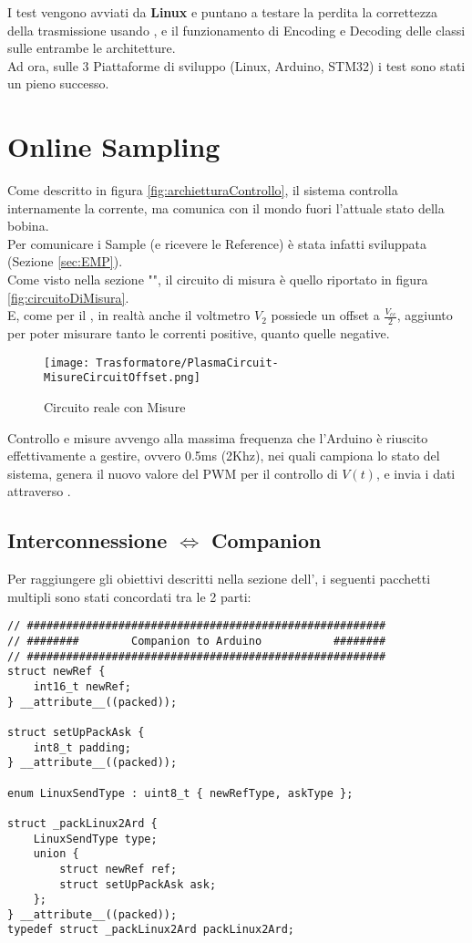 \noindent
I test vengono avviati da \textbf{Linux} e puntano a testare la perdita la correttezza della trasmissione usando , e il funzionamento di Encoding e Decoding delle classi sulle entrambe le architetture.\\
Ad ora, sulle 3 Piattaforme di sviluppo (Linux, Arduino, STM32) i test sono stati un pieno successo.

\newpage
\section{Online Sampling}
Come descritto in figura \ref{fig:archietturaControllo}, il sistema controlla internamente la corrente, ma comunica con il mondo fuori l'attuale stato della bobina.\\
Per comunicare i Sample (e ricevere le Reference) è stata infatti sviluppata (Sezione \ref{sec:EMP}).\\
Come visto nella sezione "", il circuito di misura è quello riportato in figura \ref{fig:circuitoDiMisura}.\\
E, come per il , in realtà anche il voltmetro $V_2$ possiede un offset a $\frac{V_{cc}}{2}$, aggiunto per poter misurare tanto le correnti positive, quanto quelle negative.
\begin{figure}[h]
	\centering
	\texttt{[image: Trasformatore/PlasmaCircuit-MisureCircuitOffset.png]}
	\caption[Circuito equivalente del Plasma con l'offset delle Misure]{Circuito reale con Misure}
\end{figure}

\noindent
Controllo e misure avvengo alla massima frequenza che l'Arduino è riuscito effettivamente a gestire, ovvero 0.5ms (2Khz), nei quali campiona lo stato del sistema, genera il nuovo valore del PWM per il controllo di $V(t)$, e invia i dati attraverso .

\newpage
\subsection{Interconnessione \microControllore $\Leftrightarrow$ Companion}
Per raggiungere gli obiettivi descritti nella sezione dell', i seguenti pacchetti multipli sono stati concordati tra le 2 parti:
\begin{lstlisting}[style=cppStyle,caption={Pacchetti Companion $\Rightarrow$ \microControllore   },label=lst:Companion2ArdPack]
// #######################################################
// ########        Companion to Arduino           ########
// #######################################################
struct newRef {
	int16_t newRef;
} __attribute__((packed));

struct setUpPackAsk {
	int8_t padding;
} __attribute__((packed));

enum LinuxSendType : uint8_t { newRefType, askType };

struct _packLinux2Ard {
	LinuxSendType type;
	union {
		struct newRef ref;
		struct setUpPackAsk ask;
	};
} __attribute__((packed));
typedef struct _packLinux2Ard packLinux2Ard;
\end{lstlisting}

